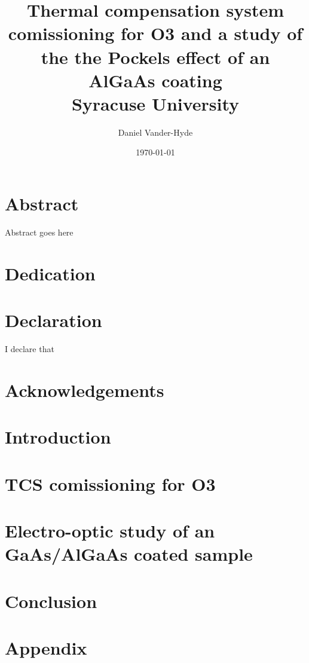 \documentclass[12pt]{report}
\title{
{Thermal compensation system comissioning for O3 and a study of the
the Pockels effect of an AlGaAs coating}\\
{\large Syracuse University}\\
}
\author{Daniel Vander-Hyde}
\date{\today}
\begin{document}
\maketitle

\chapter*{Abstract}
Abstract goes here

\chapter*{Dedication}

\chapter*{Declaration}
I declare that

\chapter*{Acknowledgements}


\tableofcontents

\maketitle

\newpage


\chapter{Introduction}

\newpage

\chapter{TCS comissioning for O3}


\chapter{Electro-optic study of an  GaAs/\textbf{AlGaAs} coated sample}


\chapter{Conclusion}

\chapter{Appendix}




\end{document}
